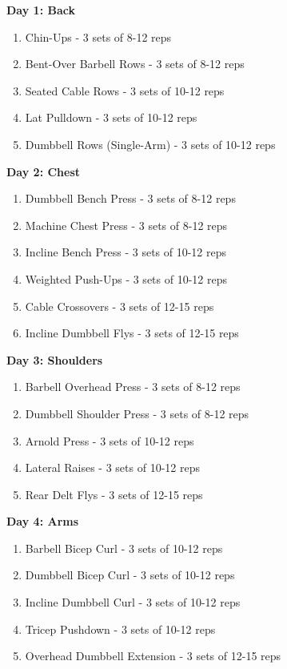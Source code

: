 \documentclass{article}
\begin{document}
\noindent %
\textbf{Day 1: Back}
\begin{enumerate}
    \item Chin-Ups - 3 sets of 8-12 reps
    \item Bent-Over Barbell Rows - 3 sets of 8-12 reps
    \item Seated Cable Rows - 3 sets of 10-12 reps
    \item Lat Pulldown - 3 sets of 10-12 reps
    \item Dumbbell Rows (Single-Arm) - 3 sets of 10-12 reps
\end{enumerate}

\vspace{\baselineskip} %

\noindent
\textbf{Day 2: Chest}
\begin{enumerate}
    \item Dumbbell Bench Press - 3 sets of 8-12 reps
    \item Machine Chest Press - 3 sets of 8-12 reps
    \item Incline Bench Press - 3 sets of 10-12 reps
    \item Weighted Push-Ups - 3 sets of 10-12 reps
    \item Cable Crossovers - 3 sets of 12-15 reps
    \item Incline Dumbbell Flys - 3 sets of 12-15 reps
\end{enumerate}

\vspace{\baselineskip}

\noindent
\textbf{Day 3: Shoulders}
\begin{enumerate}
    \item Barbell Overhead Press - 3 sets of 8-12 reps
    \item Dumbbell Shoulder Press - 3 sets of 8-12 reps
    \item Arnold Press - 3 sets of 10-12 reps
    \item Lateral Raises - 3 sets of 10-12 reps
    \item Rear Delt Flys - 3 sets of 12-15 reps
\end{enumerate}

\vspace{\baselineskip}

\noindent
\textbf{Day 4: Arms}
\begin{enumerate}
    \item Barbell Bicep Curl - 3 sets of 10-12 reps
    \item Dumbbell Bicep Curl - 3 sets of 10-12 reps
    \item Incline Dumbbell Curl - 3 sets of 10-12 reps
    \item Tricep Pushdown - 3 sets of 10-12 reps
    \item Overhead Dumbbell Extension - 3 sets of 12-15 reps
\end{enumerate}
\end{document}

